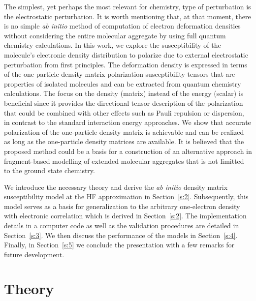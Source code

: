 \documentclass[aip,amsmath,amssymb,reprint,floatfix]{revtex4-1}
\begin{document}
The simplest, yet perhaps the most relevant for chemistry, type of perturbation 
is the electrostatic perturbation.
It is worth mentioning that, at that moment, there is no simple \emph{ab initio}
method of computation of electron deformation densities without considering the entire molecular 
aggregate by using full quantum chemistry calculations.\cite{Horn.Yuezhi.Head-Gordon.JCP.2016,Horn.Head-Gordon.JCP.2015}
In this work, we explore the susceptibility of the molecule's electronic density distribution
to polarize due to external electrostatic perturbation from first principles. 
The deformation density is expressed in terms
of the one\hyp{}particle density matrix polarization susceptibility tensors 
that are properties of isolated molecules and can be
extracted from quantum chemistry calculations. The focus on the density (matrix) instead of the energy
(scalar) is beneficial since it provides the directional tensor description
of the polarization that could be combined with other effects such as Pauli repulsion 
or dispersion,\cite{Mandado.Hermida-Ramon.JCTC.2011}
in contrast to the standard interaction energy approaches. We show that accurate polarization 
of the one\hyp{}particle density
matrix is achievable and can be realized as long as the one\hyp{}particle density matrices
are available. It is believed that the proposed method
could be a basis for a construction of an 
alternative approach in fragment\hyp{}based
modelling of extended molecular aggregates that is not limitted to the ground state chemistry.

We introduce the necessary theory and derive the \emph{ab initio} density matrix susceptibility model
at the HF approximation\cite{Roothaan.RevModPhys.1951} 
in Section~\ref{s:2}. Subsequently, this model serves as a basis for generalization to the 
arbitrary one\hyp{}electron density with electronic correlation which is derived in Section~\ref{s:2}. 
The implementation details in a computer code as well as the validation procedures are detailed
in Section~\ref{s:3}. We then discuss the performance of the models in Section~\ref{s:4}.
Finally, in Section~\ref{s:5} we conclude the presentation with a few 
remarks for future development.

\section{\label{s:2}Theory}
\end{document}

